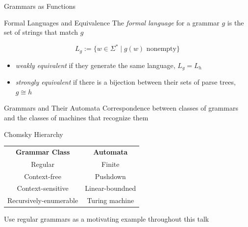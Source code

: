 \documentclass[10pt]{beamer}
\makeatletter
\newif\ifdraft
\newcommand{\todoin}[1]{\ifdraft{\todo[inline]{TODO:\@ #1}}\fi}
\makeatother
\begin{document}
\begin{frame}{Grammars as Functions}
\begin{minipage}[t]{.6\textwidth}
  \end{minipage}%
  \todoin{this right example is wrong}
\end{frame}

\begin{frame}{Formal Languages and Equivalence}
  The \emph{formal language} for a grammar $g$ is the set of strings that match $g$

  \[
    L_{g} := \{ w \in \Sigma^{*} \mid g(w) \text{ nonempty}\}
  \]

  \begin{itemize}
    \item<3-> \emph{weakly equivalent} if they generate the same language, $L_{g} = L_{h}$
    \item<4-> \emph{strongly equivalent} if there is a bijection between their sets of parse trees, $g \cong h$
  \end{itemize}

  \todoin{a + b and b + a}
\end{frame}

\begin{frame}{Grammars and Their Automata}
  Correspondence between classes of grammars and the classes of machines that recognize them

  \begin{block}{Chomsky Hierarchy}
  \begin{center}
    \begin{tabular}{c c}
      \textbf{Grammar Class} & \textbf{Automata} \\
      Regular & Finite \\
      Context-free & Pushdown \\
      Context-sensitive & Linear-boundned \\
      Recursively-enumerable & Turing machine
    \end{tabular}
  \end{center}
  \end{block}

  Use regular grammars as a motivating example throughout this talk
\end{frame}
\end{document}
